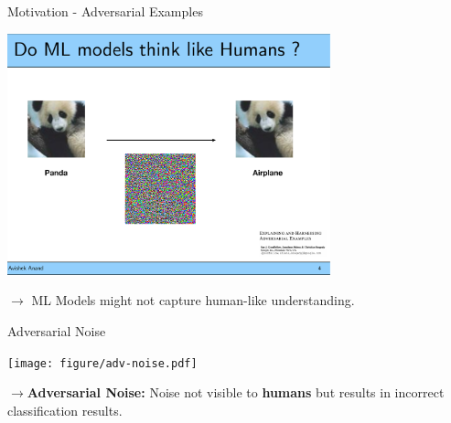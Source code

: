 \documentclass[11pt,compress,t,notes=noshow, aspectratio=169, xcolor=table]{beamer}
\begin{document}
\begin{frame}{Motivation - Adversarial Examples }

    \begin{center}
    \includegraphics[width=0.7\textwidth]{figure/panda-airplane.pdf}
    \end{center}
	\bigskip

	$\rightarrow$ ML Models might not capture human-like understanding.
\end{frame}


\begin{frame}{Adversarial Noise }
    \begin{center}
    \texttt{[image: figure/adv-noise.pdf]}
	\end{center}
	\normalsize
	$\rightarrow$\textbf{Adversarial Noise:} Noise not visible to \textbf{humans} but results in incorrect classification results.
\end{frame}

    
	

\endlecture
\end{document}
